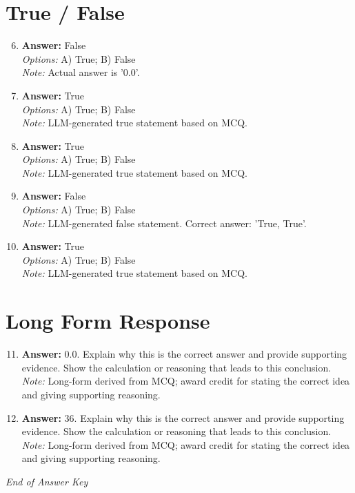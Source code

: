\documentclass[12pt]{article}
\begin{document}
\section*{True / False}
\begin{enumerate}[label=\arabic*.]
\setcounter{enumi}{5}
\item \textbf{Answer:} False
\\ \textit{Options:} A) True; B) False
\\ \textit{Note:} Actual answer is '0.0'.
\item \textbf{Answer:} True
\\ \textit{Options:} A) True; B) False
\\ \textit{Note:} LLM-generated true statement based on MCQ.
\item \textbf{Answer:} True
\\ \textit{Options:} A) True; B) False
\\ \textit{Note:} LLM-generated true statement based on MCQ.
\item \textbf{Answer:} False
\\ \textit{Options:} A) True; B) False
\\ \textit{Note:} LLM-generated false statement. Correct answer: 'True, True'.
\item \textbf{Answer:} True
\\ \textit{Options:} A) True; B) False
\\ \textit{Note:} LLM-generated true statement based on MCQ.
\end{enumerate}

\section*{Long Form Response}
\begin{enumerate}[label=\arabic*.]
\setcounter{enumi}{10}
\item \textbf{Answer:} 0.0. Explain why this is the correct answer and provide supporting evidence. Show the calculation or reasoning that leads to this conclusion.
\\ \textit{Note:} Long-form derived from MCQ; award credit for stating the correct idea and giving supporting reasoning.
\item \textbf{Answer:} 36. Explain why this is the correct answer and provide supporting evidence. Show the calculation or reasoning that leads to this conclusion.
\\ \textit{Note:} Long-form derived from MCQ; award credit for stating the correct idea and giving supporting reasoning.
\end{enumerate}

\vfill
\noindent\textit{End of Answer Key}
\end{document}
